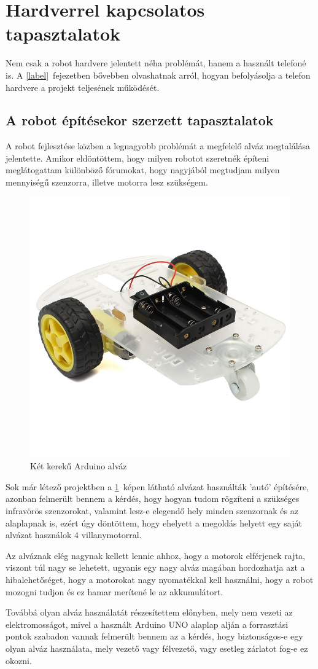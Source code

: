 \documentclass[]{thesis-ekf}
\theoremstyle{definition}
\begin{document}
\section{Hardverrel kapcsolatos tapasztalatok}
Nem csak a robot hardvere jelentett néha problémát, hanem a használt telefoné is. A \ref{label}~fejezetben bővebben olvashatnak arról, hogyan befolyásolja a telefon hardvere a projekt teljesének működését.
\subsection{A robot építésekor szerzett tapasztalatok}
A robot fejlesztése közben a legnagyobb problémát a megfelelő alváz megtalálása jelentette.
Amikor eldöntöttem, hogy milyen robotot szeretnék építeni meglátogattam különböző fórumokat, hogy nagyjából megtudjam milyen mennyiségű szenzorra, illetve motorra lesz szükségem.
\begin{figure}[h]
	\centering
	\includegraphics[width=0.4\linewidth]{images/robot_build/2_wheel_car}
	\caption{Két kerekű Arduino alváz}
	\label{2_wheeler}
\end{figure}

Sok már létező projektben a \ref{2_wheeler}~képen látható alvázat használták 'autó' építésére, azonban felmerült bennem a kérdés, hogy hogyan tudom rögzíteni a szükséges infravörös szenzorokat, valamint lesz-e elegendő hely minden szenzornak és az alaplapnak is, ezért úgy döntöttem, hogy ehelyett a megoldás helyett egy saját alvázat használok 4 villanymotorral.

Az alváznak elég nagynak kellett lennie ahhoz, hogy a motorok elférjenek rajta, viszont túl nagy se lehetett, ugyanis egy nagy alváz magában hordozhatja azt a hibalehetőséget, hogy a motorokat nagy nyomatékkal kell használni, hogy a robot mozogni tudjon és ez hamar merítené le az akkumulátort.

Továbbá olyan alváz használatát részesítettem előnyben, mely nem vezeti az elektromosságot, mivel a használt Arduino UNO alaplap alján a forrasztási pontok szabadon vannak felmerült bennem az a kérdés, hogy biztonságos-e egy olyan alváz használata, mely vezető vagy félvezető, vagy esetleg zárlatot fog-e ez okozni.
\end{document}
